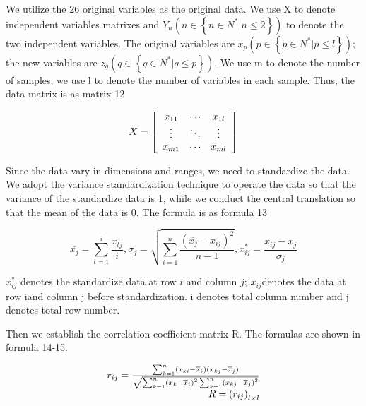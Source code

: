 We utilize the 26 original variables as the original data. We use X to denote independent variables matrixes and $Y _ { n } \left( n \in \left\{ n \in N ^ { * } | n \leq 2 \right\} \right)$ to denote the two independent variables. The original variables are $x _ { p } \left( p \in \left\{ p \in N ^ { * } | p \leq l \right\} \right)$; the new variables are $z _ { q } \left( q \in \left\{ q \in N ^ { * } | q \leq p \right\} \right)$. We use m to denote the number of samples; we use l to denote the number of variables in each sample. Thus, the data matrix is as matrix 12

\begin{equation}
X = \left[ \begin{array} { c c c } { x _ { 11 } } & { \cdots } & { x _ { 1 l } } \\ { \vdots } & { \ddots } & { \vdots } \\ { x _ { m 1 } } & { \cdots } & { x _ { m l } } \end{array} \right]
\end{equation}

Since the data vary in dimensions and ranges, we need to standardize the data. We adopt the variance standardization technique to operate the data so that the variance of the standardize data is 1, while we conduct the central translation so that the mean of the data is 0. The formula is as formula 13

\begin{equation}
\overline { x _ { j } } = \sum _ { t = 1 } ^ { i } \frac { x _ { t j } } { i } , \sigma _ { j } = \sqrt { \sum _ { i = 1 } ^ { n } \frac { \left( \overline { x _ { j } } - x _ { i j } \right) ^ { 2 } } { n - 1 } } , x _ { i j } ^ { * } = \frac { x _ { i j } - \overline { x _ { j } } } { \sigma _ { j } }
\end{equation}

$x _ { i j } ^ { * }$ denotes the standardize data at row $i$  and column $j$; $x _ { i j }$denotes the data at row iand column j before standardization. i denotes total column number and j denotes total row number. 

Then we establish the correlation coefficient matrix R. The formulas are shown in formula 14-15.

\begin{equation}
\begin{array} { r l } { r _ { i j } = \frac { \sum _ { k = 1 } ^ { n } \left( x _ { k i } - \overline { x } _ { i } \right) \left( x _ { k j } - \overline { x } _ { j } \right) } { \sqrt { \sum _ { k = 1 } ^ { n } \left( x _ { k } - \overline { x } _ { i } \right) ^ { 2 } \sum _ { k = 1 } ^ { n } \left( x _ { k j } - \overline { x } _ { j } \right) ^ { 2 } } } } \\ { R = \left( r _ { i j } \right) _ { l \times l } } \end{array}
\end{equation}

